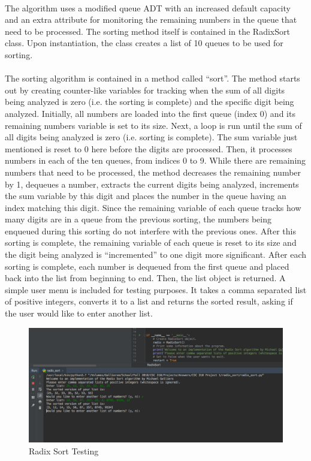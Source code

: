 \documentclass[10pt,letterpaper]{article}
\begin{document}
\paragraph{}
The algorithm uses a modified queue ADT with an increased default capacity and
an extra attribute for monitoring the remaining numbers in the queue that need
to be processed. The sorting method itself is contained in the RadixSort class.
Upon instantiation, the class creates a list of 10 queues to be used for
sorting.

\paragraph{}
The sorting algorithm is contained in a method called “sort”. The method starts
out by creating counter-like variables for tracking when the sum of all digits
being analyzed is zero (i.e. the sorting is complete) and the specific digit
being analyzed. Initially, all numbers are loaded into the first queue
(index 0) and its remaining numbers variable is set to its size. Next, a loop
is run until the sum of all digits being analyzed is zero (i.e. sorting is
complete). The sum variable just mentioned is reset to 0 here before the digits
are processed. Then, it processes numbers in each of the ten queues, from
indices 0 to 9. While there are remaining numbers that need to be processed,
the method decreases the remaining number by 1, dequeues a number, extracts the
current digits being analyzed, increments the sum variable by this digit and
places the number in the queue having an index matching this digit. Since the
remaining variable of each queue tracks how many digits are in a queue from the
previous sorting, the numbers being enqueued during this sorting do not
interfere with the previous ones. After this sorting is complete, the remaining
variable of each queue is reset to its size and the digit being analyzed is
“incremented” to one digit more significant. After each sorting is complete,
each number is dequeued from the first queue and placed back into the list from
beginning to end. Then, the list object is returned. A simple user menu is
included for testing purposes. It takes a comma separated list of positive
integers, converts it to a list and returns the sorted result, asking if the
user would like to enter another list.

\begin{figure}[H]
\centering
\includegraphics[width=\linewidth]{radix_sort_testing.png}
\caption{Radix Sort Testing}
\end{figure}
\end{document}
